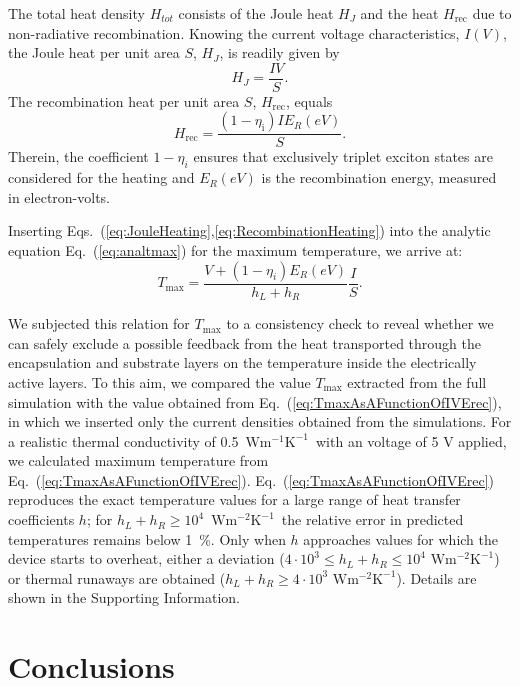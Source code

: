 \documentclass[%
9pt,
 aip,
rsi,%
 amsmath,amssymb,
preprint,%
]{revtex4-1}
\newcommand{\thermalconductivity}{$\mathrm{W m^{-1} K^{-1}}$}
\newcommand{\hcoefficient}{$\mathrm{W m^{-2} K^{-1}}$}
\begin{document}
The total heat density $H_{tot}$ consists of the Joule heat $H_J$ and the heat $H_{\mathrm{rec}}$ due to non-radiative recombination.
Knowing the current voltage characteristics, $I(V)$, the Joule heat per unit area $S$, $H_{J}$, is readily given by
\begin{equation}
		H_{J}= \frac{I V}{S}. \label{eq:JouleHeating} 
\end{equation}
The recombination heat per unit area $S$, $H_{\mathrm{rec}}$, equals
\begin{equation}
		H_{\mathrm{rec}} = \frac{(1-\eta_\mathrm{i}) I E_R(eV)}{S}. 		\label{eq:RecombinationHeating}
\end{equation}
Therein, the coefficient $1-\eta_i$ ensures that exclusively triplet exciton states are considered for the heating and $E_R(eV)$ is the recombination energy, measured in electron-volts. 

Inserting Eqs.~(\ref{eq:JouleHeating},\ref{eq:RecombinationHeating}) into the analytic equation Eq.~(\ref{eq:analtmax}) for the maximum temperature, we arrive at:
\begin{equation}
	T_{\mathrm{max}}=\frac{ V+(1-\eta_i) E_R\left(eV\right) }{h_L+h_R} \frac{I}{S}.
    \label{eq:TmaxAsAFunctionOfIVErec}
\end{equation}


We subjected this relation for $T_{\mathrm{max}}$ to a consistency check to reveal whether we can safely exclude a possible feedback from the heat transported through the encapsulation and substrate layers on the temperature inside the electrically active layers.
To this aim, we compared the value $T_{\mathrm{max}}$ extracted from the full simulation with the value obtained from Eq.~(\ref{eq:TmaxAsAFunctionOfIVErec}), in which we inserted only the current densities obtained from  the simulations. For a realistic thermal conductivity of 0.5~\thermalconductivity~with an voltage of 5 V applied, we calculated maximum temperature from Eq.~(\ref{eq:TmaxAsAFunctionOfIVErec}). 
Eq.~(\ref{eq:TmaxAsAFunctionOfIVErec}) reproduces the exact temperature values for a large range of heat transfer coefficients $h$; for $h_L + h_R \geq 10^{4}$~\hcoefficient~the relative error in predicted temperatures remains below 1~\%. 
Only when $h$ approaches values for which the device starts to overheat, either a deviation ($4\cdot 10^3 \leq h_L + h_R \leq 10^4$ \hcoefficient) or thermal runaways are obtained ($h_L + h_R \geq 4\cdot 10^3$ \hcoefficient). 
Details are shown in the Supporting Information.

\section{Conclusions}
\end{document}
